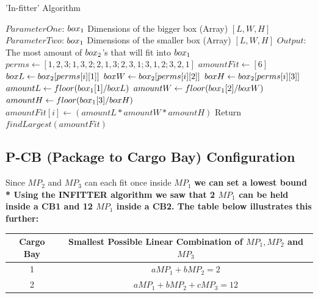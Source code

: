 \documentclass[a4paper,12pt]{article}
\begin{document}
\begin{algorithm}
  \caption{'In-fitter' Algorithm }
  \label{array-sum}
  \begin{algorithmic}[1]
    \State $ParameterOne$: $box\textsubscript{1}$ Dimensions of the bigger box (Array) $[L, W, H]$
    \State $ParameterTwo$: $box\textsubscript{1}$ Dimensions of the smaller box (Array) $[L, W, H]$
    \State $Output$: The most amount of $box\textsubscript{2}$'s that will fit into $box\textsubscript{1}$
    \State
    \State $perms \leftarrow [1,2,3;1,3,2;2,1,3;2,3,1;3,1,2;3,2,1]$
    \State $amountFit \leftarrow [6] $
    \State $boxL \leftarrow box\textsubscript{2}[perms[i][1]] $ 
    \State $boxW \leftarrow box\textsubscript{2}[perms[i][2]] $
    \State $boxH \leftarrow box\textsubscript{2}[perms[i][3]] $
    \State
    \State $amountL \leftarrow floor( box\textsubscript{1}[1]/boxL )$
    \State $amountW \leftarrow floor( box\textsubscript{1}[2]/boxW )$
    \State $amountH \leftarrow floor( box\textsubscript{1}[3]/boxH )$
    \State $amountFit[i] \leftarrow (amountL * amountW * amountH)$
    \EndFor
    \State Return $findLargest(amountFit)$
    \EndProcedure
  \end{algorithmic}
\end{algorithm}


\subsection{P-CB (Package to Cargo Bay) Configuration}
Since $MP_2$ and $MP_3$ can each fit once inside $MP_1$ \bf{we can set a lowest bound} \\*
Using the INFITTER algorithm we saw that 2 $MP_1$ can be held inside a CB1 and 12 $MP_1$ inside a CB2.  The table below illustrates this further:

\begin{center}
\begin{tabular}{ |c|c| }
 \hline
 Cargo Bay & Smallest Possible Linear Combination of $MP_1, MP_2$ and $MP_3$\\\hline
 1 & $aMP_1 + bMP_2 = 2$  \\
 2 & $aMP_1 + bMP_2 + cMP_3 = 12$ \\
 \hline
\end{tabular}
\end{center}
\end{document}
